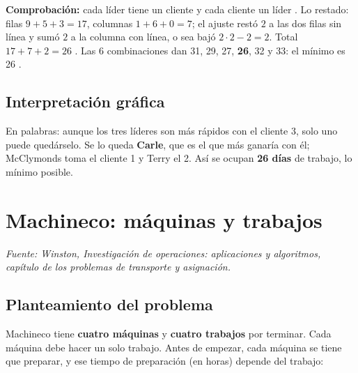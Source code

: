 \documentclass[11pt,a4paper]{article}
\begin{document}
\textbf{Comprobación:} cada líder tiene un cliente y cada cliente un líder \checkmark. Lo restado:
filas $9 + 5 + 3 = 17$, columnas $1 + 6 + 0 = 7$; el ajuste restó $2$ a las dos filas sin línea y sumó $2$ a la
columna con línea, o sea bajó $2 \cdot 2 - 2 = 2$. Total $17 + 7 + 2 = 26$ \checkmark. Las 6 combinaciones dan
31, 29, 27, \textbf{26}, 32 y 33: el mínimo es 26 \checkmark.

\subsection*{Interpretación gráfica}
\noindent\begin{minipage}[c]{0.52\textwidth}\centering
{}
\end{minipage}\hfill
\begin{minipage}[c]{0.44\textwidth}
En palabras: aunque los tres líderes son más rápidos con el cliente 3, solo uno puede quedárselo. Se lo queda
\textbf{Carle}, que es el que más ganaría con él; McClymonds toma el cliente 1 y Terry el 2. Así se ocupan
\textbf{26 días} de trabajo, lo mínimo posible.
\end{minipage}
\par

\section{Machineco: máquinas y trabajos}
\textit{Fuente: Winston, Investigación de operaciones: aplicaciones y algoritmos, capítulo de los problemas de transporte y asignación.}

\subsection*{Planteamiento del problema}
Machineco tiene \textbf{cuatro máquinas} y \textbf{cuatro trabajos} por terminar. Cada máquina debe hacer un solo
trabajo. Antes de empezar, cada máquina se tiene que preparar, y ese tiempo de preparación (en horas) depende del
trabajo:
\end{document}

